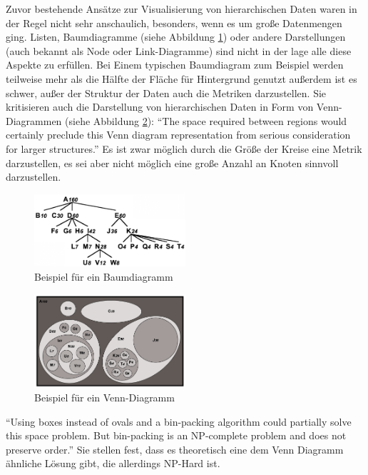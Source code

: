 Zuvor bestehende Ansätze zur Visualisierung von hierarchischen Daten waren in der Regel nicht sehr anschaulich, besonders, wenn es um große Datenmengen ging. Listen, Baumdiagramme (siehe Abbildung \ref{fig:baumdiagramm}) oder andere Darstellungen (auch bekannt als Node oder Link-Diagramme) sind nicht in der lage alle diese Aspekte zu erfüllen. Bei Einem typischen Baumdiagram zum Beispiel werden teilweise mehr als die Hälfte der Fläche für Hintergrund genutzt \cite[3]{johnson1991tree} außerdem ist es schwer, außer der Struktur der Daten auch die Metriken darzustellen. Sie kritisieren auch die Darstellung von hierarchischen Daten in Form von Venn-Diagrammen (siehe Abbildung \ref{fig:venndiagram}): \enquote{The space required between regions would certainly preclude this Venn diagram representation from serious consideration for larger structures.}\cite[5]{johnson1991tree} Es ist zwar möglich durch die Größe der Kreise eine Metrik darzustellen, es sei aber nicht möglich eine große Anzahl an Knoten sinnvoll darzustellen. 

\begin{figure}[ht]
    \centering
    \includegraphics[width=0.5\textwidth]{images/treediagram.png}
    \caption{Beispiel für ein Baumdiagramm}
    \label{fig:baumdiagramm}
\end{figure}

\begin{figure}[ht]
    \centering
    \includegraphics[width=0.5\textwidth]{images/verdiagram.png}
    \caption{Beispiel für ein Venn-Diagramm}
    \label{fig:venndiagram}
\end{figure}

\enquote{Using boxes instead of ovals and a bin-packing algorithm could partially solve this space
problem. But bin-packing is an NP-complete problem and does not preserve order.}\cite[5]{johnson1991tree} Sie stellen fest, dass es theoretisch eine dem Venn Diagramm ähnliche Lösung gibt, die allerdings NP-Hard ist. 

